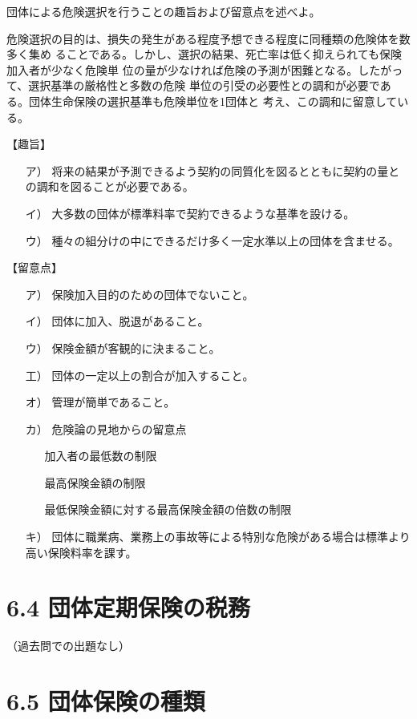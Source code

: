 \documentclass[report,gutter=10mm,fore-edge=10mm,uplatex,dvipdfmx]{jlreq}
\begin{document}
団体による危険選択を行うことの趣旨および留意点を述べよ。
\answer{}

危険選択の目的は、損失の発生がある程度予想できる程度に同種類の危険体を数多く集め
ることである。しかし、選択の結果、死亡率は低く抑えられても保険加入者が少なく危険単
位の量が少なければ危険の予測が困難となる。したがって、選択基準の厳格性と多数の危険
単位の引受の必要性との調和が必要である。団体生命保険の選択基準も危険単位を1団体と
考え、この調和に留意している。

【趣旨】

\begin{itemize}
\item[ ア）] 将来の結果が予測できるよう契約の同質化を図るとともに契約の量との調和を図ることが必要である。
\item[ イ）] 大多数の団体が標準料率で契約できるような基準を設ける。
\item[ ウ）] 種々の組分けの中にできるだけ多く一定水準以上の団体を含ませる。
\end{itemize}

【留意点】

\begin{itemize}
\item[ ア）] 保険加入目的のための団体でないこと。
\item[ イ）] 団体に加入、脱退があること。
\item[ ウ）] 保険金額が客観的に決まること。
\item[ 工）] 団体の一定以上の割合が加入すること。
\item[ オ）] 管理が簡単であること。
\item[ カ）] 危険論の見地からの留意点
\begin{itemize}
 \item[ ] 加入者の最低数の制限
 \item[ ] 最高保険金額の制限
 \item[ ] 最低保険金額に対する最高保険金額の倍数の制限
\end{itemize}
\item[ キ）] 団体に職業病、業務上の事故等による特別な危険がある場合は標準より高い保険料率を課す。
\end{itemize}
\section{6.4 団体定期保険の税務}
（過去問での出題なし）

\section{6.5 団体保険の種類}
\end{document}
